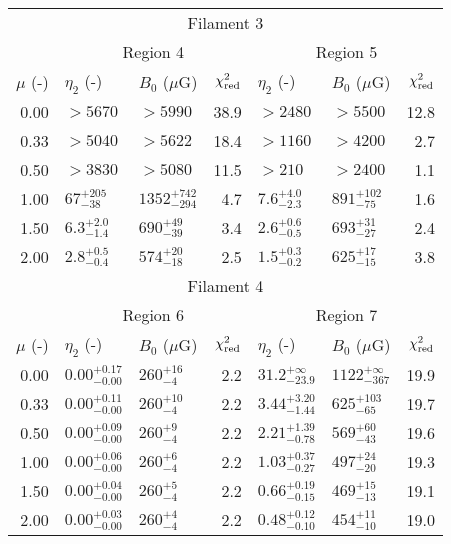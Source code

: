 \begin{tabular}{@{}rllrllr@{}}
\toprule
\multicolumn{7}{c}{Filament 3} \\
\cmidrule{1-7}
{} & \multicolumn{3}{c}{Region 4}
   & \multicolumn{3}{c}{Region 5} \\
\cmidrule(lr){2-4} \cmidrule(l){5-7}
$\mu$ (-) & $\eta_2$ (-) & $B_0$ ($\mu$G) & $\chi^2_{\mathrm{red}}$
          & $\eta_2$ (-) & $B_0$ ($\mu$G) & $\chi^2_{\mathrm{red}}$ \\
\cmidrule{1-7}
0.00 & $>5670$ & $>5990$ & 38.9
     & $>2480$ & $>5500$ & 12.8 \\
0.33 & $>5040$ & $>5622$ & 18.4
     & $>1160$ & $>4200$ & 2.7 \\
0.50 & $>3830$ & $>5080$ & 11.5
     & $>210$ & $>2400$ & 1.1 \\
1.00 & ${67}^{+205}_{-38}$ & ${1352}^{+742}_{-294}$ & 4.7
     & ${7.6}^{+4.0}_{-2.3}$ & ${891}^{+102}_{-75}$ & 1.6 \\
1.50 & ${6.3}^{+2.0}_{-1.4}$ & ${690}^{+49}_{-39}$ & 3.4
     & ${2.6}^{+0.6}_{-0.5}$ & ${693}^{+31}_{-27}$ & 2.4 \\
2.00 & ${2.8}^{+0.5}_{-0.4}$ & ${574}^{+20}_{-18}$ & 2.5
     & ${1.5}^{+0.3}_{-0.2}$ & ${625}^{+17}_{-15}$ & 3.8 \\

\midrule
\multicolumn{7}{c}{Filament 4} \\
\cmidrule{1-7}
{} & \multicolumn{3}{c}{Region 6\tablenotemark{a}}
   & \multicolumn{3}{c}{Region 7} \\
\cmidrule(lr){2-4} \cmidrule(l){5-7}
$\mu$ (-) & $\eta_2$ (-) & $B_0$ ($\mu$G) & $\chi^2_{\mathrm{red}}$
          & $\eta_2$ (-) & $B_0$ ($\mu$G) & $\chi^2_{\mathrm{red}}$ \\
\cmidrule{1-7}
0.00 & ${0.00}^{+0.17}_{-0.00}$ & ${260}^{+16}_{-4}$ & 2.2
     & ${31.2}^{+\infty}_{-23.9}$ & ${1122}^{+\infty}_{-367}$ & 19.9 \\
0.33 & ${0.00}^{+0.11}_{-0.00}$ & ${260}^{+10}_{-4}$ & 2.2
     & ${3.44}^{+3.20}_{-1.44}$ & ${625}^{+103}_{-65}$ & 19.7 \\
0.50 & ${0.00}^{+0.09}_{-0.00}$ & ${260}^{+9}_{-4}$ & 2.2
     & ${2.21}^{+1.39}_{-0.78}$ & ${569}^{+60}_{-43}$ & 19.6 \\
1.00 & ${0.00}^{+0.06}_{-0.00}$ & ${260}^{+6}_{-4}$ & 2.2
     & ${1.03}^{+0.37}_{-0.27}$ & ${497}^{+24}_{-20}$ & 19.3 \\
1.50 & ${0.00}^{+0.04}_{-0.00}$ & ${260}^{+5}_{-4}$ & 2.2
     & ${0.66}^{+0.19}_{-0.15}$ & ${469}^{+15}_{-13}$ & 19.1 \\
2.00 & ${0.00}^{+0.03}_{-0.00}$ & ${260}^{+4}_{-4}$ & 2.2
     & ${0.48}^{+0.12}_{-0.10}$ & ${454}^{+11}_{-10}$ & 19.0 \\


\end{tabular}
